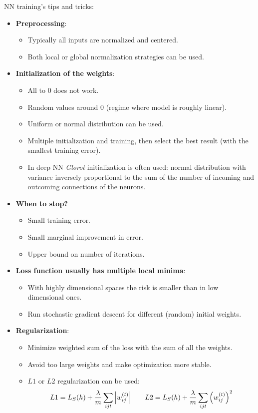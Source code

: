 \documentclass[12pt]{report}
\theoremstyle{plain}
\begin{document}
\begin{flushleft}
\begin{tcolorbox}
	\label{box:NN_SGD_backpropagation}
\end{tcolorbox}
NN training's tips and tricks:
\begin{itemize}
	\item \textbf{Preprocessing}:
	\begin{itemize}
		\item Typically all inputs are normalized and centered.
		\item Both local or global normalization strategies can be used.
	\end{itemize}
	\item \textbf{Initialization of the weights}:
	\begin{itemize}
		\item All to 0 does not work.
		\item Random values around 0 (regime where model is roughly linear).
		\item Uniform or normal distribution can be used.
		\item Multiple initialization and training, then select the best result (with the smallest training error).
		\item In deep NN \textit{Glorot} initialization is often used: normal distribution with variance inversely proportional to the sum of the number of incoming and outcoming connections of the neurons.  
	\end{itemize}
	\item \textbf{When to stop?}
	\begin{itemize}
		\item Small training error.
		\item Small marginal improvement in error.
		\item Upper bound on number of iterations.
	\end{itemize}
	\item \textbf{Loss function usually has multiple local minima}:
	\begin{itemize}
		\item With highly dimensional spaces the risk is smaller than in low dimensional ones.
		\item Run stochastic gradient descent for different (random) initial weights.
	\end{itemize}
	\item \textbf{Regularization}:
	\begin{itemize}
		\item Minimize weighted sum of the loss with the sum of all the weights.
		\item Avoid too large weights and make optimization more stable.
		\item $L1$ or $L2$ regularization can be used:
		\[ L1 = L_S(h)+\frac{\lambda}{m}\sum_{ijt}\abs{w_{ij}^{(t)}} \qquad L2 = L_S(h)+\frac{\lambda}{m}\sum_{ijt}\left(w_{ij}^{(t)}\right)^2 \] 
	\end{itemize}
\end{itemize}









\end{flushleft}
\end{document}
